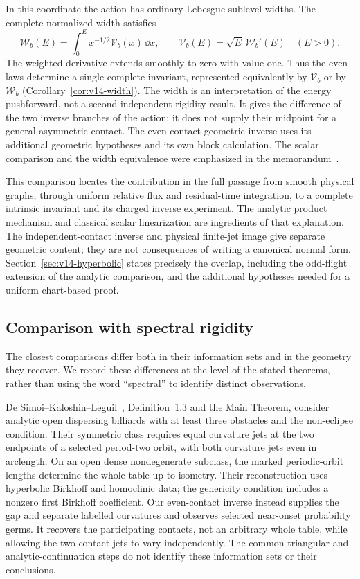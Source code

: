 In this coordinate the action has ordinary Lebesgue sublevel widths.
The complete normalized width satisfies
\[
 \mathcal W_b(E)=\int_0^E x^{-1/2}\mathcal V_b(x)\,\dd x,
 \qquad \mathcal V_b(E)=\sqrt E\,\mathcal W_b'(E)\quad(E>0).
\]
The weighted derivative extends smoothly to zero with value one.
Thus the even laws determine a single complete invariant, represented
equivalently by $\mathcal V_b$ or by $\mathcal W_b$
(Corollary~\ref{cor:v14-width}). The width is an interpretation of the
energy pushforward, not a second independent rigidity result. It gives
the difference of the two inverse branches of the action; it does not
supply their midpoint for a general asymmetric contact. The even-contact
geometric inverse uses its additional geometric hypotheses and its own
block calculation. The scalar comparison and the width equivalence
were emphasized in the memorandum~\cite{A2ReviewV14}.

This comparison locates the contribution in the full passage from
smooth physical graphs, through uniform relative flux and residual-time
integration, to a complete intrinsic invariant and its charged inverse
experiment. The analytic product mechanism and classical scalar
linearization are ingredients of that explanation. The independent-contact inverse and physical finite-jet
image give separate geometric content; they are not consequences of
writing a canonical normal form. Section~\ref{sec:v14-hyperbolic}
states precisely the overlap, including the odd-flight extension of
the analytic comparison, and the additional hypotheses needed for a
uniform chart-based proof.

\subsection{Comparison with spectral rigidity}
\label{sec:v13-literature}
The closest comparisons differ both in their information sets and in
the geometry they recover. We record these differences at the level
of the stated theorems, rather than using the word ``spectral'' to
identify distinct observations.

De Simoi--Kaloshin--Leguil~\cite{DSKL}, Definition~1.3 and the Main
Theorem, consider analytic open dispersing billiards with at least
three obstacles and the non-eclipse condition. Their symmetric class
requires equal curvature jets at the two endpoints of a selected
period-two orbit, with both curvature jets even in arclength. On an
open dense nondegenerate subclass, the marked periodic-orbit lengths
determine the whole table up to isometry. Their reconstruction uses
hyperbolic Birkhoff and homoclinic data; the genericity condition includes
a nonzero first Birkhoff coefficient. Our even-contact inverse instead
supplies the gap and separate labelled curvatures and observes selected
near-onset probability germs. It recovers the participating contacts,
not an arbitrary whole table, while allowing the two contact jets to
vary independently. The common triangular and analytic-continuation
steps do not identify these information sets or their conclusions.

